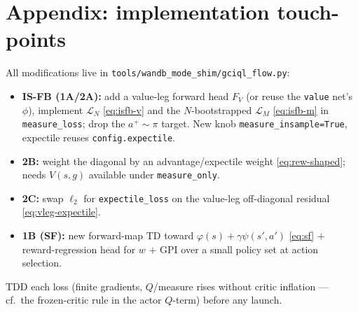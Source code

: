 \documentclass[11pt]{article}
\newcommand{\Fmap}{F}                                %
\begin{document}
\section*{Appendix: implementation touch-points}
\small
All modifications live in \texttt{tools/wandb\_mode\_shim/gciql\_flow.py}:
\begin{itemize}[leftmargin=1.4em,itemsep=1pt]
  \item \textbf{IS-FB (1A/2A):} add a value-leg forward head $\Fmap_V$ (or reuse
        the \texttt{value} net's $\phi$), implement $\mathcal{L}_N$
        \eqref{eq:isfb-v} and the $N$-bootstrapped $\mathcal{L}_M$
        \eqref{eq:isfb-m} in \texttt{measure\_loss}; drop the $a^{+}\sim\pi$
        target. New knob \texttt{measure\_insample=True}, expectile reuses
        \texttt{config.expectile}.
  \item \textbf{2B:} weight the diagonal by an advantage/expectile weight
        \eqref{eq:rew-shaped}; needs $V(s,g)$ available under \texttt{measure\_only}.
  \item \textbf{2C:} swap $\ell_2$ for \texttt{expectile\_loss} on the value-leg
        off-diagonal residual \eqref{eq:vleg-expectile}.
  \item \textbf{1B (SF):} new forward-map TD toward $\varphi(s)+\gamma\psi(s',a')$
        \eqref{eq:sf} $+$ reward-regression head for $w$ $+$ GPI over a small
        policy set at action selection.
\end{itemize}
TDD each loss (finite gradients, $Q$/measure rises without critic inflation ---
cf.\ the frozen-critic rule in the actor $Q$-term) before any launch.
\end{document}
